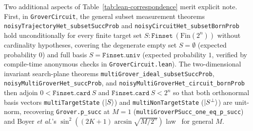 {\setlength{\emergencystretch}{5em}%
Two additional aspects of Table~\ref{tab:lean-correspondence} merit explicit note. First, in \texttt{GroverCircuit}, the general subset measurement theorems \texttt{noisyTrajectoryHet\_subsetSuccProb} and \texttt{noisyCircuitHet\_subsetBornProb} hold unconditionally for every finite target set $S : \texttt{Finset}\ (\mathrm{Fin}(2^n))$ without cardinality hypotheses, covering the degenerate empty set $S = \emptyset$ (expected probability $0$) and full basis $S = \texttt{Finset.univ}$ (expected probability $1$, verified by compile-time anonymous checks in \texttt{GroverCircuit.lean}). The two-dimensional invariant search-plane theorems \texttt{multiGrover\_ideal\_subsetSuccProb}, \texttt{noisyMultiGroverHet\_succProb}, and \texttt{noisyMultiGroverHet\_circuit\_bornProb} then adjoin $0 < \texttt{Finset.card}\ S$ and $\texttt{Finset.card}\ S < 2^n$ so that both orthonormal basis vectors \texttt{multiTargetState} ($\ket{S}$) and \texttt{multiNonTargetState} ($\ket{S^\perp}$) are unit-norm, recovering \texttt{Grover.p\_succ} at $M = 1$ (\texttt{multiGroverPSucc\_one\_eq\_p\_succ}) and Boyer \emph{et al.}'s $\sin^2((2K + 1)\arcsin\sqrt{M/2^n})$ law~\cite{Boyer1998} for general $M$.\par}

